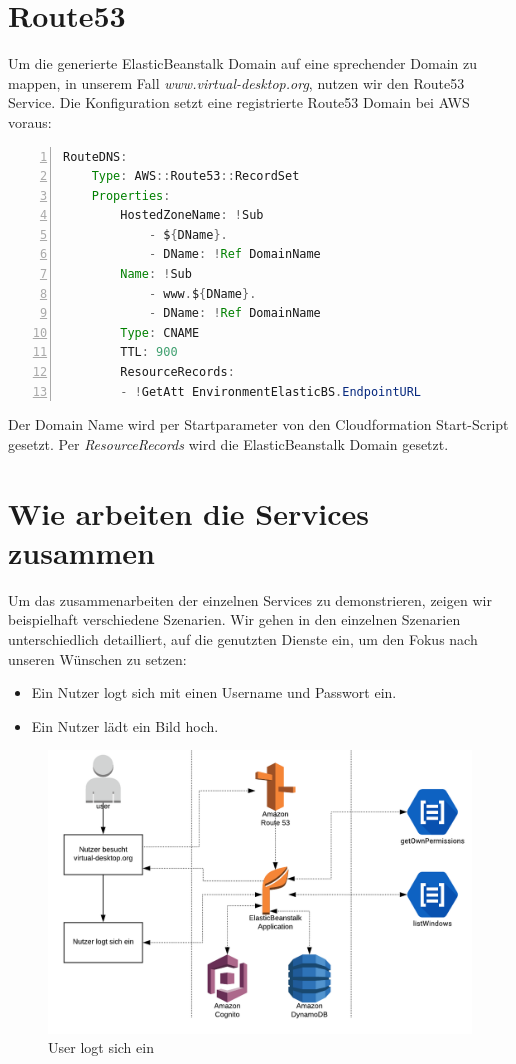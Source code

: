 \documentclass[a4paper, 12pt]{scrreprt}
\renewcommand\_{\textunderscore\allowbreak}
\begin{document}
\section{Route53}
Um die generierte ElasticBeanstalk Domain auf eine sprechender Domain zu mappen, in unserem Fall \textit{www.virtual-desktop.org}, nutzen wir den Route53 Service. Die Konfiguration setzt eine registrierte Route53 Domain bei AWS voraus:

\begin{lstlisting}[xleftmargin=\parindent,numbers=left,numberstyle=\small,numbersep=8pt,frame=L,mathescape=true, basicstyle=\small, language=Java, lineskip={1.0pt}]
RouteDNS:
    Type: AWS::Route53::RecordSet
    Properties:
        HostedZoneName: !Sub
            - ${DName}.
            - DName: !Ref DomainName
        Name: !Sub
            - www.${DName}.
            - DName: !Ref DomainName
        Type: CNAME
        TTL: 900
        ResourceRecords:
        - !GetAtt EnvironmentElasticBS.EndpointURL
\end{lstlisting}

Der Domain Name wird per Startparameter von den Cloudformation Start-Script gesetzt. Per \textit{ResourceRecords} wird die ElasticBeanstalk Domain gesetzt.
 
\section{Wie arbeiten die Services zusammen}

Um das zusammenarbeiten der einzelnen Services zu demonstrieren, zeigen wir beispielhaft verschiedene Szenarien. Wir gehen in den einzelnen Szenarien unterschiedlich detailliert, auf die genutzten Dienste ein, um den Fokus nach unseren Wünschen zu setzen:
\begin{itemize}
\item Ein Nutzer logt sich mit einen Username und Passwort ein.
\item Ein Nutzer lädt ein Bild hoch.
\end{itemize}

\begin{figure}[h]
\centering
\includegraphics[scale=0.35]{Flow-Dia-1.png} 
\caption{User logt sich ein}
\end{figure}
\end{document}
